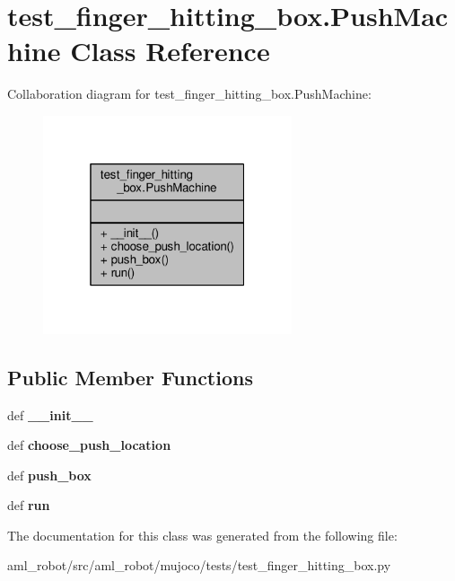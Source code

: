 \hypertarget{classtest__finger__hitting__box_1_1_push_machine}{\section{test\-\_\-finger\-\_\-hitting\-\_\-box.\-Push\-Machine Class Reference}
\label{classtest__finger__hitting__box_1_1_push_machine}
}


Collaboration diagram for test\-\_\-finger\-\_\-hitting\-\_\-box.\-Push\-Machine\-:\nopagebreak
\begin{figure}[H]
\begin{center}
\leavevmode
\includegraphics[width=208pt]{classtest__finger__hitting__box_1_1_push_machine__coll__graph}
\end{center}
\end{figure}
\subsection*{Public Member Functions}
\begin{DoxyCompactItemize}
\item 
\hypertarget{classtest__finger__hitting__box_1_1_push_machine_ad52ba782f193ab129ffde0c1ddcd0fcc}{def {\bfseries \-\_\-\-\_\-init\-\_\-\-\_\-}}\label{classtest__finger__hitting__box_1_1_push_machine_ad52ba782f193ab129ffde0c1ddcd0fcc}

\item 
\hypertarget{classtest__finger__hitting__box_1_1_push_machine_afaa9aa2694821cd0eb1b92dd6beb60d6}{def {\bfseries choose\-\_\-push\-\_\-location}}\label{classtest__finger__hitting__box_1_1_push_machine_afaa9aa2694821cd0eb1b92dd6beb60d6}

\item 
\hypertarget{classtest__finger__hitting__box_1_1_push_machine_a7384a263cd151b0aba6d76102ab89167}{def {\bfseries push\-\_\-box}}\label{classtest__finger__hitting__box_1_1_push_machine_a7384a263cd151b0aba6d76102ab89167}

\item 
\hypertarget{classtest__finger__hitting__box_1_1_push_machine_a05c2f0b6270bb59ff7f2a4b08401fec3}{def {\bfseries run}}\label{classtest__finger__hitting__box_1_1_push_machine_a05c2f0b6270bb59ff7f2a4b08401fec3}

\end{DoxyCompactItemize}


The documentation for this class was generated from the following file\-:\begin{DoxyCompactItemize}
\item 
aml\-\_\-robot/src/aml\-\_\-robot/mujoco/tests/test\-\_\-finger\-\_\-hitting\-\_\-box.\-py\end{DoxyCompactItemize}
